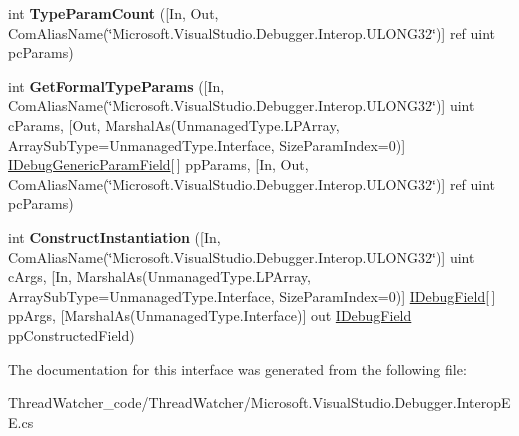 \begin{DoxyCompactItemize}
\item 
\hypertarget{interface_microsoft_1_1_visual_studio_1_1_debugger_1_1_interop_e_e_1_1_i_debug_generic_field_definition_a29f41023db4badcf78192c4e58d013a9}{int {\bfseries Type\+Param\+Count} (\mbox{[}In, Out, Com\+Alias\+Name(\char`\"{}Microsoft.\+Visual\+Studio.\+Debugger.\+Interop.\+U\+L\+O\+N\+G32\char`\"{})\mbox{]} ref uint pc\+Params)}\label{interface_microsoft_1_1_visual_studio_1_1_debugger_1_1_interop_e_e_1_1_i_debug_generic_field_definition_a29f41023db4badcf78192c4e58d013a9}

\item 
\hypertarget{interface_microsoft_1_1_visual_studio_1_1_debugger_1_1_interop_e_e_1_1_i_debug_generic_field_definition_a51be3fda83b400ff0332d6bd14805bef}{int {\bfseries Get\+Formal\+Type\+Params} (\mbox{[}In, Com\+Alias\+Name(\char`\"{}Microsoft.\+Visual\+Studio.\+Debugger.\+Interop.\+U\+L\+O\+N\+G32\char`\"{})\mbox{]} uint c\+Params, \mbox{[}Out, Marshal\+As(Unmanaged\+Type.\+L\+P\+Array, Array\+Sub\+Type=Unmanaged\+Type.\+Interface, Size\+Param\+Index=0)\mbox{]} \hyperlink{interface_microsoft_1_1_visual_studio_1_1_debugger_1_1_interop_e_e_1_1_i_debug_generic_param_field}{I\+Debug\+Generic\+Param\+Field}\mbox{[}$\,$\mbox{]} pp\+Params, \mbox{[}In, Out, Com\+Alias\+Name(\char`\"{}Microsoft.\+Visual\+Studio.\+Debugger.\+Interop.\+U\+L\+O\+N\+G32\char`\"{})\mbox{]} ref uint pc\+Params)}\label{interface_microsoft_1_1_visual_studio_1_1_debugger_1_1_interop_e_e_1_1_i_debug_generic_field_definition_a51be3fda83b400ff0332d6bd14805bef}

\item 
\hypertarget{interface_microsoft_1_1_visual_studio_1_1_debugger_1_1_interop_e_e_1_1_i_debug_generic_field_definition_ab49fc15aca7b1616ee2f94db4458f67a}{int {\bfseries Construct\+Instantiation} (\mbox{[}In, Com\+Alias\+Name(\char`\"{}Microsoft.\+Visual\+Studio.\+Debugger.\+Interop.\+U\+L\+O\+N\+G32\char`\"{})\mbox{]} uint c\+Args, \mbox{[}In, Marshal\+As(Unmanaged\+Type.\+L\+P\+Array, Array\+Sub\+Type=Unmanaged\+Type.\+Interface, Size\+Param\+Index=0)\mbox{]} \hyperlink{interface_microsoft_1_1_visual_studio_1_1_debugger_1_1_interop_e_e_1_1_i_debug_field}{I\+Debug\+Field}\mbox{[}$\,$\mbox{]} pp\+Args, \mbox{[}Marshal\+As(Unmanaged\+Type.\+Interface)\mbox{]} out \hyperlink{interface_microsoft_1_1_visual_studio_1_1_debugger_1_1_interop_e_e_1_1_i_debug_field}{I\+Debug\+Field} pp\+Constructed\+Field)}\label{interface_microsoft_1_1_visual_studio_1_1_debugger_1_1_interop_e_e_1_1_i_debug_generic_field_definition_ab49fc15aca7b1616ee2f94db4458f67a}

\end{DoxyCompactItemize}


The documentation for this interface was generated from the following file\+:\begin{DoxyCompactItemize}
\item 
Thread\+Watcher\+\_\+code/\+Thread\+Watcher/Microsoft.\+Visual\+Studio.\+Debugger.\+Interop\+E\+E.\+cs\end{DoxyCompactItemize}
